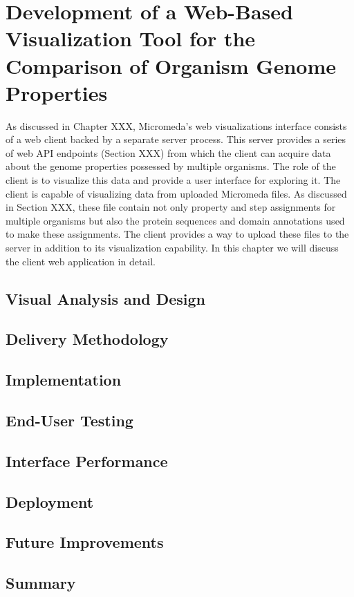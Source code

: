 \chapter{Development of a Web-Based Visualization Tool for the Comparison of Organism Genome Properties}

As discussed in Chapter XXX, Micromeda's web visualizations interface consists of a web client backed by a separate server process. This server provides a series of web API endpoints (Section XXX) from which the client can acquire data about the genome properties possessed by multiple organisms. The role of the client is to visualize this data and provide a user interface for exploring it. The client is capable of visualizing data from uploaded Micromeda files. As discussed in Section XXX, these file contain not only property and step assignments for multiple organisms but also the protein sequences and domain annotations used to make these assignments. The client provides a way to upload these files to the server in addition to its visualization capability. In this chapter we will discuss the client web application in detail.

\section{Visual Analysis and Design}



\section{Delivery Methodology}

\section{Implementation}

\section{End-User Testing}

\section{Interface Performance}

\section{Deployment}

\section{Future Improvements}

\section{Summary} 